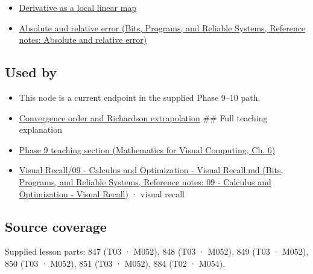 \begin{itemize}
\tightlist
\item
  \hyperref[appendix-7bc181935c42]{Derivative as a local linear map}
\item
  \href{../01-Bits-Programs-and-Reliable-Systems/main.pdf\#nameddest=appendix-3ae74e89b4e6}{Absolute and relative error (Bits, Programs, and Reliable Systems, Reference notes: Absolute and relative error)}
\end{itemize}

\subsection{Used by}\label{appendix-e2d7b4f2161d-used-by}

\hypertarget{appendix-e2d7b4f2161d-used-by}{}

\begin{itemize}
\item
  This node is a current endpoint in the supplied Phase 9--10 path.
\item
  \hyperref[appendix-aca80b6bf17a]{Convergence order and Richardson extrapolation} \#\# Full teaching explanation
\item
  \href{../02-Mathematics-for-Visual-Computing/main.pdf\#nameddest=02-foundations-ii-ch022-numerical-differentiation-and-automatic-differentiation}{Phase 9 teaching section (Mathematics for Visual Computing, Ch. 6)}
\item
  \href{../01-Bits-Programs-and-Reliable-Systems/main.pdf\#nameddest=appendix-adf48f5dc5c1}{Visual Recall/09 - Calculus and Optimization - Visual Recall.md (Bits, Programs, and Reliable Systems, Reference notes: 09 - Calculus and Optimization - Visual Recall)} · visual recall
\end{itemize}

\subsection{Source coverage}\label{appendix-e2d7b4f2161d-source-coverage}

\hypertarget{appendix-e2d7b4f2161d-source-coverage}{}

Supplied lesson parts: 847 (T03 · M052), 848 (T03 · M052), 849 (T03 · M052), 850 (T03 · M052), 851 (T03 · M052), 884 (T02 · M054).
